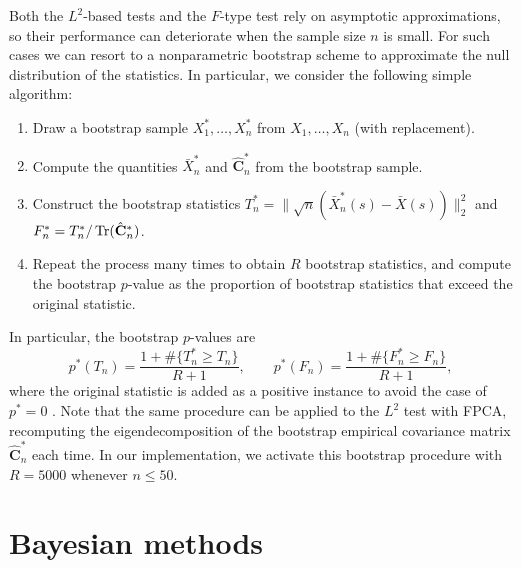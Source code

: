 Both the \(L^2\)-based tests and the \(F\)-type test rely on asymptotic approximations, so their performance can deteriorate when the sample size \(n\) is small. For such cases we can resort to a nonparametric bootstrap scheme to approximate the null distribution of the statistics. In particular, we consider the following simple algorithm:
\begin{enumerate}
  \item Draw a bootstrap sample \(X_1^*,\dots, X_n^*\) from \(X_1,\dots, X_n\) (with replacement).
  \item Compute the quantities \(\bar{X}_n^*\) and \(\hat{\mathbf C}_n^*\) from the bootstrap sample.
  \item Construct the bootstrap statistics \(T_n^* = \|\sqrt{n}(\bar{X}_n^*(s) - \bar{X}(s))\|^2_2\) and \(F_n^* = T_n^*/\operatorname{Tr}(\hat{\mathbf C}_n^*)\).
  \item Repeat the process many times to obtain \(R\) bootstrap statistics, and compute the bootstrap \(p\)-value as the proportion of bootstrap statistics that exceed the original statistic.
\end{enumerate}
In particular, the bootstrap \(p\)-values are
\[
p^*(T_n) = \frac{1 + \#\{T_n^* \geq T_n\}}{R+1},\qquad p^*(F_n) = \frac{1 + \#\{F_n^* \geq F_n\}}{R+1},
\]
where the original statistic is added as a positive instance to avoid the case of \(p^*=0\) \citep[see][p.~141]{davison1997bootstrap}. Note that the same procedure can be applied to the \(L^2\) test with \acs{FPCA}, recomputing the eigendecomposition of the bootstrap empirical covariance matrix \(\hat{\mathbf C}_n^*\) each time. In our implementation, we activate this bootstrap procedure with \(R=5000\) whenever \(n\leq 50\).

\section{Bayesian methods}

